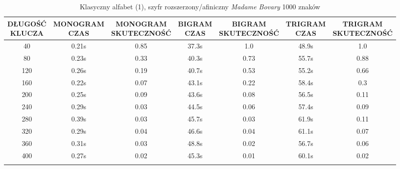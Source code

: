 \documentclass[a4paper]{article}
\theoremstyle{defn}
\theoremstyle{theorem}
\theoremstyle{lemma}
\theoremstyle{cor}
\theoremstyle{fact}
\begin{document}
\begin{center}\begin{small}\begin{longtable}{|c|c|c|c|c|c|c|}
\hline \makecell{DŁUGOŚĆ\\KLUCZA} &  \makecell{MONOGRAM\\CZAS} & \makecell{MONOGRAM\\SKUTECZNOŚĆ} & \makecell{BIGRAM\\CZAS} &  \makecell{BIGRAM\\SKUTECZNOŚĆ} & \makecell{TRIGRAM\\CZAS} & \makecell{TRIGRAM\\SKUTECZNOŚĆ}\\ \hline
40 & 0.21s & 0.85 & 37.3s & 1.0 & 48.9s & 1.0 \\ \hline
80 & 0.23s & 0.33 & 40.3s & 0.73 & 55.7s & 0.88 \\ \hline
120 & 0.26s & 0.19 & 40.7s & 0.53 & 55.2s & 0.66 \\ \hline
160 & 0.22s & 0.07 & 43.1s & 0.22 & 58.4s & 0.3 \\ \hline
200 & 0.25s & 0.09 & 43.6s & 0.08 & 56.5s & 0.11 \\ \hline
240 & 0.29s & 0.03 & 44.5s & 0.06 & 57.4s & 0.09 \\ \hline
280 & 0.39s & 0.03 & 45.7s & 0.03 & 61.9s & 0.11 \\ \hline
320 & 0.29s & 0.04 & 46.6s & 0.04 & 61.1s & 0.07 \\ \hline
360 & 0.31s & 0.03 & 48.8s & 0.02 & 56.7s & 0.06 \\ \hline
400 & 0.27s & 0.02 & 45.3s & 0.01 & 60.1s & 0.02 \\ \hline
\caption{Klasyczny alfabet (1), szyfr rozszerzony/afiniczny \textit{Madame Bovary} 1000 znaków}
\end{longtable}\end{small}\end{center}
\end{document}
